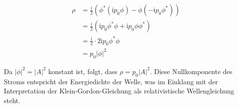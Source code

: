 \begin{align*}
\rho &= \frac{\mathrm{i}}{2} \left( \phi^* (\mathrm{i} p_0 \phi) - \phi (-\mathrm{i} p_0 \phi^*) \right) \\
&= \frac{\mathrm{i}}{2} \left( \mathrm{i} p_0 \phi^* \phi + \mathrm{i} p_0 \phi \phi^* \right) \\
&= \frac{\mathrm{i}}{2} \cdot 2 \mathrm{i} p_0 \phi^* \phi \\
&= p_0 |\phi|^2
\end{align*}

Da $|\phi|^2 = |A|^2$ konstant ist, folgt, dass $\rho = p_0 |A|^2$. Diese Nullkomponente des Stroms entspricht der Energiedichte der Welle, was im Einklang mit der Interpretation der Klein-Gordon-Gleichung als relativistische Wellengleichung steht.


